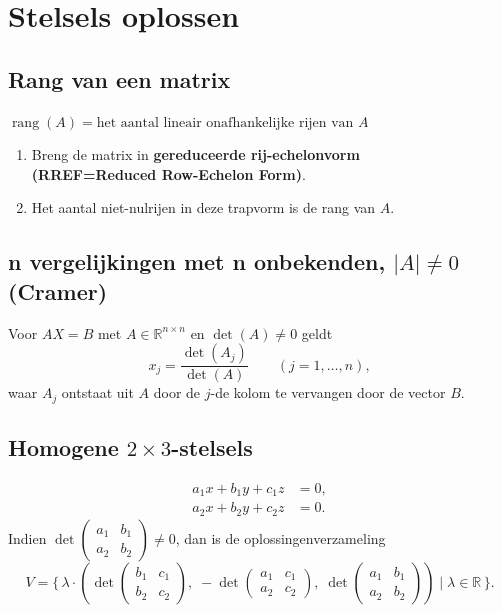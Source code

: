 \documentclass[a5paper]{article}
\begin{document}


\newpage

\section{Stelsels oplossen}

\subsection{Rang van een matrix}
$ \operatorname{rang}(A) = \text{het aantal lineair onafhankelijke rijen van } A $

\begin{enumerate}
  \item Breng de matrix in \textbf{gereduceerde rij-echelonvorm \scriptsize \\ (RREF=Reduced Row-Echelon Form)}.
  
  \item Het aantal niet-nulrijen in deze trapvorm is de rang van \(A\).
\end{enumerate}

\subsection{n vergelijkingen met n onbekenden, $|A|\neq 0$ (Cramer)}
Voor $AX=B$ met $A\in\mathbb{R}^{n\times n}$ en $\det(A)\neq0$ geldt
\[
x_j = \frac{\det(A_j)}{\det(A)} \qquad (j=1,\dots,n),
\]
waar $A_j$ ontstaat uit $A$ door de $j$-de kolom te vervangen door de vector $B$.

\subsection{Homogene $2\times 3$-stelsels}
\begin{align*}
a_1 x + b_1 y + c_1 z &= 0, \\
a_2 x + b_2 y + c_2 z &= 0.
\end{align*}
Indien $\det\!\begin{pmatrix} a_1 & b_1 \\ a_2 & b_2 \end{pmatrix}\neq0$, dan is de oplossingenverzameling
\[
V = \{\, \lambda \cdot (\det\!\begin{pmatrix} b_1 & c_1 \\ b_2 & c_2 \end{pmatrix}, \;
          -\det\!\begin{pmatrix} a_1 & c_1 \\ a_2 & c_2 \end{pmatrix}, \;
           \det\!\begin{pmatrix} a_1 & b_1 \\ a_2 & b_2 \end{pmatrix}) \mid \lambda\in\mathbb{R}\,\}.
\]
\end{document}
